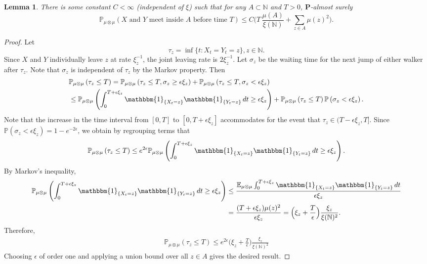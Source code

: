 \documentclass[11pt,a4paper]{scrartcl}
\numberwithin{equation}{section}
\theoremstyle{plain}
\newtheorem{lemma}[theorem]{Lemma}
\theoremstyle{definition}
\theoremstyle{remark}
\newcommand{\bE}{\ensuremath{\mathbb{E}}}
\newcommand{\bN}{\ensuremath{\mathbb{N}}}
\newcommand{\bP}{\ensuremath{\mathbb{P}}}
\newcommand{\ind}{\ensuremath{\mathbbm{1}}}
\newcommand{\di}{\,\textup{d}}
\newcommand{\bfP}{\mathbf{P}}
\begin{document}
\begin{lemma}\label{lem:nomeet}
There is some constant $C<\infty$ (independent of $\xi$) such that for any $A\subset\bN$ and $T>0$, $\bfP$-almost surely
$$\bP_{\mu\otimes\mu}(X \text{ and } Y \text{ meet inside } A \text{ before time }T)\leq C\Big(T \,\frac{\mu(A)}{\xi(\bN)} + \sum_{z\in A}\mu(z)^2\Big).$$
\end{lemma}
\begin{proof}
Let  $$\tau_z=\inf\{t: X_t=Y_t=z\}, z\in \bN.$$ 	
Since $X$ and $Y$ individually leave $z$ at rate $\xi_z^{-1}$, the joint leaving rate is $2\xi_z^{-1}$. Let $\sigma_z$ be the waiting time for the next jump of either walker after $\tau_z$. Note that $\sigma_z$ is independent of $\tau_z$ by the Markov property. Then
\begin{align}
&\bP_{\mu\otimes\mu}\left(\tau_z\leq T \right) 
= \bP_{\mu\otimes\mu}\left(\tau_z\leq T, \sigma_z\geq \epsilon \xi_z \right)      
+ \bP_{\mu\otimes\mu}\left(\tau_z\leq T, \sigma_z< \epsilon \xi_z \right)
\\
&\leq\bP_{\mu\otimes\mu}\left(\int_0^{T+\epsilon\xi_z} \ind_{\{X_t=z\}}\ind_{\{Y_t=z\}}\di t \geq \epsilon \xi_z \right) 
+ \bP_{\mu\otimes\mu}\left(\tau_z\leq T\right)\bP\left(\sigma_z< \epsilon \xi_z \right).
\end{align}
Note that the increase in the time interval from $[0,T]$ to $[0,T+\epsilon\xi_z]$ accommodates for the event that $\tau_z\in(T-\epsilon\xi_z,T]$. Since $\bP\left(\sigma_z< \epsilon \xi_z \right)=1-e^{-2\epsilon}$, we obtain by regrouping terms that
$$
\bP_{\mu\otimes\mu}\left(\tau_z\leq T \right)\leq e^{2\epsilon} \bP_{\mu\otimes\mu}\left(\int_0^{T+\epsilon\xi_z} \ind_{\{X_t=z\}}\ind_{\{Y_t=z\}}\di t \geq \epsilon \xi_z\right).
$$
By Markov's inequality,
\begin{align}
\bP_{\mu\otimes\mu}\left(\int_0^{T+\epsilon\xi_z} \ind_{\{X_t=z\}}\ind_{\{Y_t=z\}}\di t \geq \epsilon \xi_z \right)       
&\leq \frac{\bE_{\mu\otimes\mu} \int_0^{T+\epsilon\xi_z} \ind_{\{X_t=z\}}\ind_{\{Y_t=z\}}\di t }{\epsilon \xi_z}   \\
&= \frac{(T+\epsilon\xi_z)\mu(z)^2}{\epsilon \xi_z} = \Big(\xi_z+\frac{T}{\epsilon}\Big) \frac{\xi_z}{\xi(\bN)^2}.
\end{align}
Therefore, 
\begin{align}\label{eq:meeting-estimate-1}
\bP_{\mu\otimes\mu}\left(\tau_z\leq T \right)
\leq e^{2\epsilon} \Big(\xi_z+\frac{T}{\epsilon}\Big) \frac{\xi_z}{\xi(\bN)^2}
\end{align}
Choosing $\epsilon$ of order one and applying a union bound over all $z\in A$ gives the desired result.
\end{proof}
\end{document}
